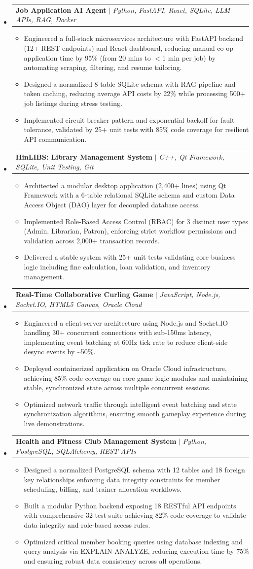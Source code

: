 \documentclass[letterpaper,11pt]{article}
\makeatletter
\newcommand{\resumeItem}[1]{
  \item\small{
    {#1 \vspace{-2pt}}
  }
}
\newcommand{\resumeProjectHeading}[2]{
    \item
    \begin{tabular*}{0.97\textwidth}{l@{\extracolsep{\fill}}r}
      \small#1 & #2 \\
    \end{tabular*}\vspace{-7pt}
}
\newcommand{\resumeSubHeadingListStart}{\begin{itemize}[leftmargin=0.15in, label={}]}
\newcommand{\resumeSubHeadingListEnd}{\end{itemize}}
\newcommand{\resumeItemListStart}{\begin{itemize}}
\newcommand{\resumeItemListEnd}{\end{itemize}\vspace{-5pt}}
\makeatother
\begin{document}
\resumeSubHeadingListStart
\resumeProjectHeading{\textbf{Job Application AI Agent} $|$ \emph{Python, FastAPI, React, SQLite, LLM APIs, RAG, Docker}}{} \n \resumeItemListStart \n \resumeItem{Engineered a full-stack microservices architecture with FastAPI backend (12+ REST endpoints) and React dashboard, reducing manual co-op application time by 95\% (from 20 mins to $<$1 min per job) by automating scraping, filtering, and resume tailoring.} \n \resumeItem{Designed a normalized 8-table SQLite schema with RAG pipeline and token caching, reducing average API costs by 22\% while processing 500+ job listings during stress testing.} \n \resumeItem{Implemented circuit breaker pattern and exponential backoff for fault tolerance, validated by 25+ unit tests with 85\% code coverage for resilient API communication.} \n \resumeItemListEnd \n \n \resumeProjectHeading{\textbf{HinLIBS: Library Management System} $|$ \emph{C++, Qt Framework, SQLite, Unit Testing, Git}}{} \n \resumeItemListStart \n \resumeItem{Architected a modular desktop application (2,400+ lines) using Qt Framework with a 6-table relational SQLite schema and custom Data Access Object (DAO) layer for decoupled database access.} \n \resumeItem{Implemented Role-Based Access Control (RBAC) for 3 distinct user types (Admin, Librarian, Patron), enforcing strict workflow permissions and validation across 2,000+ transaction records.} \n \resumeItem{Delivered a stable system with 25+ unit tests validating core business logic including fine calculation, loan validation, and inventory management.} \n \resumeItemListEnd \n \n \resumeProjectHeading{\textbf{Real-Time Collaborative Curling Game} $|$ \emph{JavaScript, Node.js, Socket.IO, HTML5 Canvas, Oracle Cloud}}{} \n \resumeItemListStart \n \resumeItem{Engineered a client-server architecture using Node.js and Socket.IO handling 30+ concurrent connections with sub-150ms latency, implementing event batching at 60Hz tick rate to reduce client-side desync events by \textasciitilde{}50\%.} \n \resumeItem{Deployed containerized application on Oracle Cloud infrastructure, achieving 85\% code coverage on core game logic modules and maintaining stable, synchronized state across multiple concurrent sessions.} \n \resumeItem{Optimized network traffic through intelligent event batching and state synchronization algorithms, ensuring smooth gameplay experience during live demonstrations.} \n \resumeItemListEnd \n \n \resumeProjectHeading{\textbf{Health and Fitness Club Management System} $|$ \emph{Python, PostgreSQL, SQLAlchemy, REST APIs}}{} \n \resumeItemListStart \n \resumeItem{Designed a normalized PostgreSQL schema with 12 tables and 18 foreign key relationships enforcing data integrity constraints for member scheduling, billing, and trainer allocation workflows.} \n \resumeItem{Built a modular Python backend exposing 18 RESTful API endpoints with comprehensive 32-test suite achieving 82\% code coverage to validate data integrity and role-based access rules.} \n \resumeItem{Optimized critical member booking queries using database indexing and query analysis via EXPLAIN ANALYZE, reducing execution time by 75\% and ensuring robust data consistency across all operations.} \n \resumeItemListEnd
\resumeSubHeadingListEnd
\end{document}
